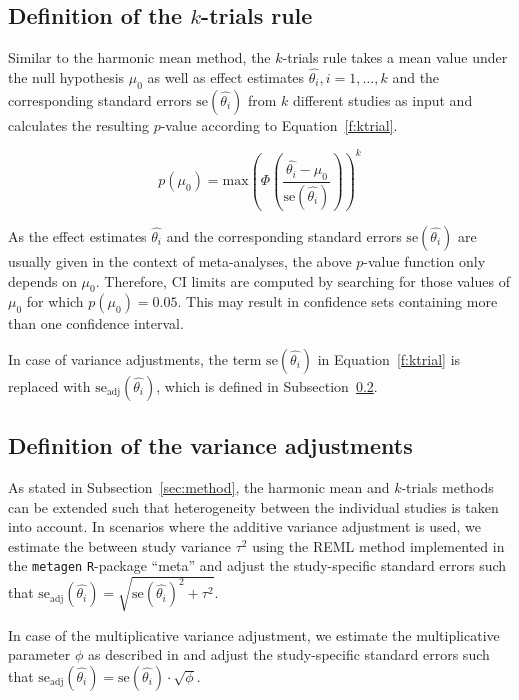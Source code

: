 \documentclass[letterpaper, 12pt]{article}
\begin{document}
\subsection{Definition of the $k$-trials rule} \label{sec:ktrial}

Similar to the harmonic mean method, the $k$-trials rule takes a mean value under the null hypothesis $\mu_{0}$ as well as effect estimates $\hat{\theta_{i}}, i = 1, \dots, k$ and the corresponding standard errors $\text{se}(\hat{\theta_i})$ from $k$ different studies as input and calculates the resulting $p$-value according to Equation~\ref{f:ktrial}.

\begin{equation}\label{f:ktrial}
p(\mu_0) = \text{max} \left( \Phi \left( \frac{\hat{\theta_i} - \mu_0}{\text{se}(\hat{\theta_{i}})} \right) \right)^k
\end{equation}

As the effect estimates $\hat{\theta_i}$ and the corresponding standard errors $\text{se}(\hat{\theta_i})$ are usually given in the context of meta-analyses, the above $p$-value function only depends on $\mu_{0}$. Therefore, CI limits are computed by searching for those values of $\mu_0$ for which $p(\mu_0) = 0.05$. This may result in confidence sets containing more than one confidence interval. 

In case of variance adjustments, the term $\text{se}(\hat{\theta_i})$  in Equation~\ref{f:ktrial} is replaced with $\text{se}_{\text{adj}}(\hat{\theta_i})$, which is defined in Subsection~\ref{sec:varadj}.

\subsection{Definition of the variance adjustments} \label{sec:varadj}

As stated in Subsection~\ref{sec:method}, the harmonic mean and $k$-trials methods can be extended such that heterogeneity between the individual studies is taken into account. In scenarios where the additive variance adjustment is used, we estimate the between study variance $\tau^2$ using the REML method implemented in the \texttt{metagen} \texttt{R}-package ``meta'' and adjust the study-specific standard errors such that $\text{se}_{\text{adj}}(\hat{\theta_i}) = \sqrt{\text{se}(\hat{\theta_i})^2 + \tau^2}$.

In case of the multiplicative variance adjustment, we estimate the multiplicative parameter $\phi$ as described in \citet{mawd:etal:17} and adjust the study-specific standard errors such that $\text{se}_{\text{adj}}(\hat{\theta_i}) = \text{se}(\hat{\theta_i}) \cdot \sqrt{\phi}$.
\end{document}
